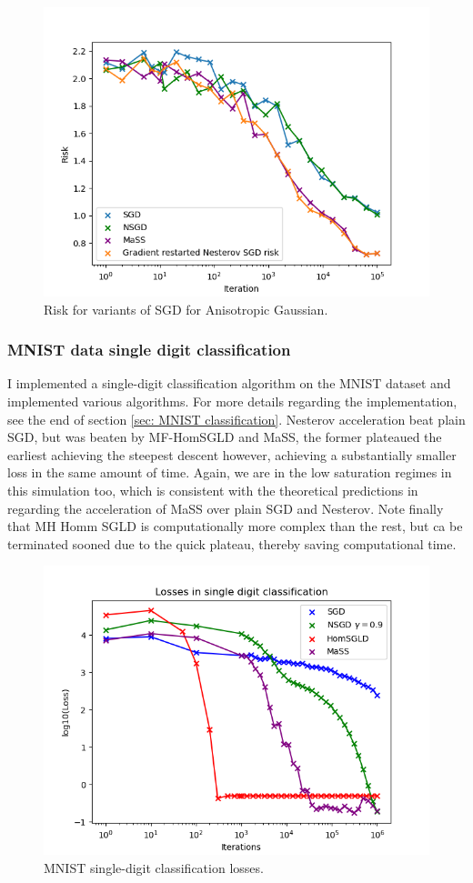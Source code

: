 \documentclass{article}
\begin{document}
\begin{figure}[H]
    \centering
    \includegraphics[width=0.7\linewidth]{images/Nguyen2018-SGD-algos-risk-aniso-gauss.png}
    \caption{Risk for variants of SGD for Anisotropic Gaussian.}
    \label{fig: sgd risk anisotropic gauss}
\end{figure}
 

\subsubsection{MNIST data single digit classification}\label{sec: single digit classification}

I implemented a single-digit classification algorithm on the MNIST dataset and implemented various algorithms. For more details regarding the implementation, see the end of section \ref{sec: MNIST classification}.	Nesterov acceleration beat plain SGD, but was beaten by MF-HomSGLD and MaSS, the former plateaued the earliest achieving the steepest descent however, achieving a substantially smaller loss in the same amount of time. Again, we are in the low saturation regimes in this simulation too, which is consistent with the theoretical predictions in \cite{liu2019acceleratingsgdmomentumoverparameterized} regarding the acceleration of MaSS over plain SGD and Nesterov. Note finally that MH Homm SGLD is computationally more complex than the rest, but ca be terminated sooned due to the quick plateau, thereby saving computational time.
\begin{figure}[H]
   \centering
   \includegraphics[width=0.8\linewidth]{images/Spiliopoulos2019-SGD-algos-single-digit classification.png}
   \caption{MNIST single-digit classification losses.}
   \label{fig: MNIST losses}
 \end{figure}
\end{document}
